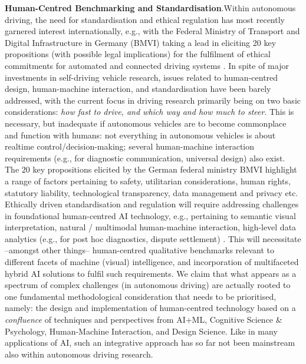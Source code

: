 \documentclass[a4paper]{article}
\begin{document}
\textbf{\sffamily Human-Centred Benchmarking and Standardisation}.\quad Within autonomous driving, the need for standardisation and ethical regulation has most recently garnered interest internationally, e.g.,  with the Federal Ministry of Transport and Digital Infrastructure in Germany (BMVI) taking a lead in eliciting 20 key propositions (with possible legal implications) for the fulfilment of ethical commitments for automated and connected driving systems \cite{BMVI2018}. In spite of major investments in self-driving vehicle research, issues related to human-centred design, human-machine interaction, and standardisation have been barely addressed, with  the current focus in driving research primarily being on two basic considerations: \emph{how fast to drive, and which way and how much to steer}. This is necessary, but inadequate if autonomous vehicles are to become commonplace and function with humans:  not everything in autonomous vehicles is about realtime control/decision-making; several human-machine interaction requirements (e.g., for diagnostic communication, universal design) also exist. The  $20$ key propositions elicited by the German federal ministry BMVI highlight a range of factors pertaining to safety, utilitarian considerations, human rights, statutory liability, technological transparency, data management and privacy etc. Ethically driven standardisation and regulation will require addressing challenges in foundational human-centred AI technology, e.g., pertaining to semantic visual interpretation, natural / multimodal human-machine interaction, high-level data analytics (e.g., for post hoc diagnostics, dispute settlement) \cite{SuchanECAI20,SuchanIJCAI19}. This will necessitate --amongst other things-- human-centred qualitative benchmarks relevant to different facets of machine (visual) intelligence, and incorporation of multifaceted hybrid AI solutions to fulfil such requirements. We claim that what appears as a spectrum of complex challenges (in autonomous driving) are actually rooted to one fundamental methodological consideration that needs to be prioritised, namely: the design and implementation of human-centred technology based on a \emph{confluence} of techniques and perspectives from AI+ML, Cognitive Science \& Psychology, Human-Machine Interaction, and Design Science. Like in many applications of AI, such an integrative approach has so far not been mainstream also within autonomous driving research.
\end{document}
